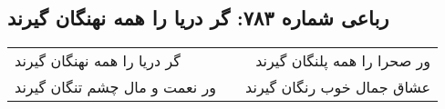 \begin{center}
\section*{رباعی شماره ۷۸۳: گر دریا را همه نهنگان گیرند}
\label{sec:0783}
\begin{longtable}{l p{0.5cm} r}
گر دریا را همه نهنگان گیرند
&&
ور صحرا را همه پلنگان گیرند
\\
ور نعمت و مال چشم تنگان گیرند
&&
عشاق جمال خوب رنگان گیرند
\\
\end{longtable}
\end{center}
